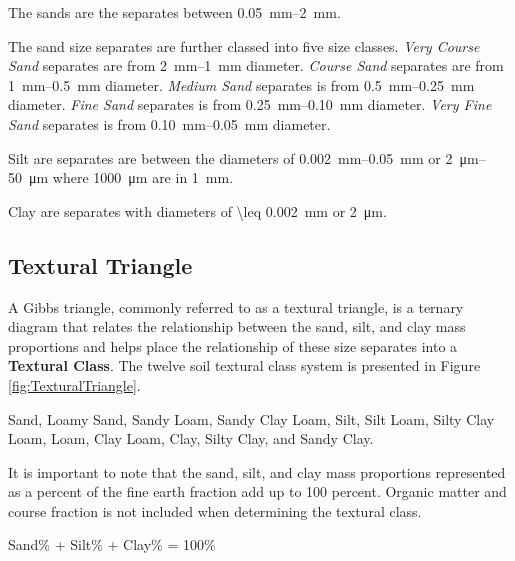 \documentclass[letterpaper, 12pt]{article}
\begin{document}
The sands are the separates between \qtyrange{0.05}{2}{mm}.

The sand size separates are further classed into five size classes. \textit{Very Course Sand} separates are from \qtyrange{2}{1}{mm} diameter. \textit{Course Sand} separates are from \qtyrange{1}{0.5}{mm} diameter. \textit{Medium Sand} separates is from \qtyrange{0.5}{0.25}{mm} diameter. \textit{Fine Sand} separates is from \qtyrange{0.25}{0.10}{mm} diameter. \textit{Very Fine Sand} separates is from \qtyrange{0.10}{0.05}{mm} diameter.
    
Silt are separates are between the diameters of \qtyrange{0.002}{0.05}{mm} or \qtyrange{2}{50}{\micro\metre} where \qty{1000}{\micro\meter} are in \qty{1}{\milli\meter}.

Clay are separates with diameters of \qty{ \leq 0.002}{mm} or \qty{2}{\micro\metre}.

\subsection{Textural Triangle}
    
A Gibbs triangle, commonly referred to as a textural triangle, is a ternary diagram that relates the relationship between the sand, silt, and clay mass proportions and helps place the relationship of these size separates into a \textbf{Textural Class}. The twelve soil textural class system is presented in Figure \ref{fig:TexturalTriangle}.
    
Sand, Loamy Sand, Sandy Loam, Sandy Clay Loam, Silt, Silt Loam, Silty Clay Loam, Loam, Clay Loam, Clay, Silty Clay, and Sandy Clay.
    
It is important to note that the sand, silt, and clay mass proportions represented as a percent of the fine earth fraction add up to 100 percent. Organic matter and course fraction is not included when determining the textural class.
    
\begin{center}
Sand\% + Silt\% + Clay\% = 100\%
\end{center}
    


    
\end{document}

